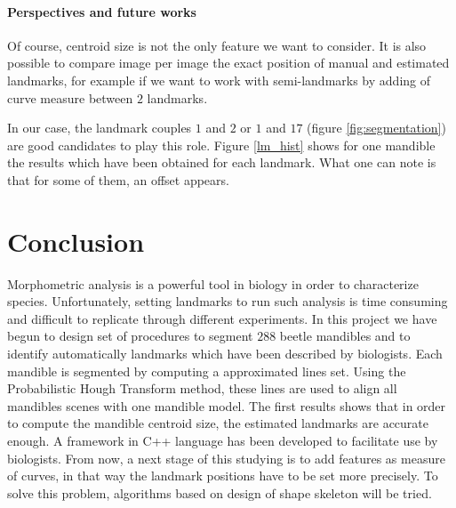 \documentclass[twoside,twocolumn,10pt]{article}
\begin{document}
\paragraph{Perspectives and future works}
Of course, centroid size is not the only feature we want to
consider. It is also possible to compare image per image the exact
position of manual and estimated landmarks, for example if we want to
work with semi-landmarks by adding of curve measure between $2$
landmarks.

In our case, the landmark couples $1$ and $2$ or $1$ and $17$ (figure
\ref{fig:segmentation}) are good candidates to play this role. Figure
\ref{lm_hist} shows for one mandible the results which have been obtained
for each landmark. What one can note is that for some of them, an
offset appears. 
\section{Conclusion}
Morphometric analysis is a powerful tool in biology in order to
characterize species. Unfortunately, setting landmarks to run such
analysis is time consuming and difficult to replicate through
different experiments. In this project we have begun to design set of
procedures to segment $288$ beetle mandibles and to identify automatically
landmarks which have been described by biologists. Each mandible is
segmented by computing a approximated lines set. Using the
Probabilistic Hough Transform method, these lines are
used to align all mandibles scenes with one mandible model. The
first results shows that in order to compute the mandible centroid
size, the estimated landmarks are accurate enough. A framework in
C++ language has been developed to facilitate use by biologists. From now, a next stage of this studying is to add features as measure of curves,
in that way the landmark positions have to be set more precisely. To
solve this problem, algorithms based on design of shape skeleton will
be tried.




\end{document}
